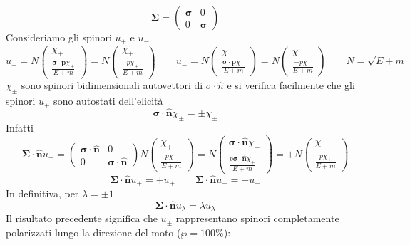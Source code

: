 $$
\boldsymbol{\Sigma} = \begin{pmatrix} \boldsymbol{\sigma} & 0 \\ 0 & \boldsymbol{\sigma} \end{pmatrix}
$$
Consideriamo gli spinori $u_+$ e $u_-$
$$
u_+ = N \begin{pmatrix} \chi_+ \\ \frac{\boldsymbol{\sigma} \cdot \mathbf{p} \chi_+}{E + m} \end{pmatrix} = N \begin{pmatrix} \chi_+ \\ \frac{p \chi_+}{E + m} \end{pmatrix} \qquad u_- = N \begin{pmatrix} \chi_- \\ \frac{\boldsymbol{\sigma} \cdot \mathbf{p} \chi_-}{E + m} \end{pmatrix} = N \begin{pmatrix} \chi_- \\ \frac{-p \chi_-}{E + m} \end{pmatrix} \qquad N = \sqrt{E + m}
$$
$\chi_\pm$ sono spinori bidimensionali autovettori di $\sigma\cdot\hat{n}$ e si verifica facilmente che gli spinori $u_\pm$ sono autostati dell'elicità
$$
\boldsymbol{\sigma} \cdot \hat{\mathbf{n}} \chi_\pm = \pm \chi_\pm
$$
Infatti
$$
\boldsymbol{\Sigma} \cdot \hat{\mathbf{n}} u_+ = \begin{pmatrix} \boldsymbol{\sigma} \cdot \hat{\mathbf{n}} & 0 \\ 0 & \boldsymbol{\sigma} \cdot \hat{\mathbf{n}} \end{pmatrix} N \begin{pmatrix} \chi_+ \\ \frac{p \chi_+}{E + m} \end{pmatrix} = N \begin{pmatrix} \boldsymbol{\sigma} \cdot \hat{\mathbf{n}} \chi_+ \\ \frac{p \boldsymbol{\sigma} \cdot \hat{\mathbf{n}} \chi_+}{E + m} \end{pmatrix} = +N \begin{pmatrix} \chi_+ \\ \frac{p \chi_+}{E + m} \end{pmatrix}
$$
$$
\boldsymbol{\Sigma} \cdot \hat{\mathbf{n}} u_+ = +u_+ \qquad \boldsymbol{\Sigma} \cdot \hat{\mathbf{n}} u_- = -u_-
$$
In definitiva, per $\lambda=\pm 1$
$$
\boldsymbol{\Sigma} \cdot \hat{\mathbf{n}} u_\lambda = \lambda u_\lambda
$$
Il risultato precedente significa che $u_\pm$ rappresentano spinori completamente polarizzati lungo la direzione del moto ($\wp=100\%$):
